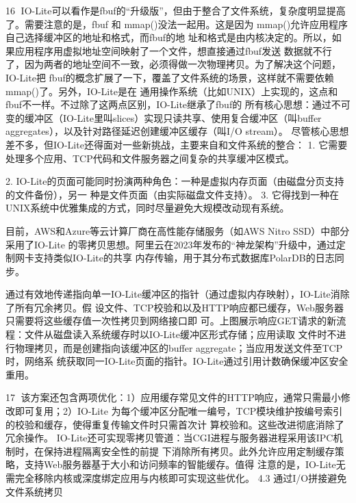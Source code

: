                                                                16
IO-Lite可以看作是fbuf的“升级版”，但由于整合了文件系统，复杂度明显提高了。需要注意的是，fbuf
和 mmap()﻿没法一起用。这是因为 ﻿mmap()﻿允许应用程序自己选择缓冲区的地址和格式，而fbuf的地
址和格式是由内核决定的。所以，如果应用程序用虚拟地址空间映射了一个文件，想直接通过fbuf发送
数据就不行了，因为两者的地址空间不一致，必须得做一次物理拷贝。为了解决这个问题，IO-Lite把
fbuf的概念扩展了一下，覆盖了文件系统的场景，这样就不需要依赖 ﻿mmap()﻿了。另外，IO-Lite是在
通用操作系统（比如UNIX）上实现的，这点和fbuf不一样。不过除了这两点区别，IO-Lite继承了fbuf的
所有核心思想：通过不可变的缓冲区（IO-Lite里叫slices）实现只读共享、使用复合缓冲区（叫buffer
aggregates），以及针对路径延迟创建缓冲区缓存（叫I/O stream）。
尽管核心思想差不多，但IO-Lite还得面对一些新挑战，主要来自和文件系统的整合：
  1. 它需要处理多个应用、TCP代码和文件服务器之间复杂的共享缓冲区模式。

  2. IO-Lite的页面可能同时扮演两种角色：一种是虚拟内存页面（由磁盘分页支持的文件备份），另一
     种是文件页面（由实际磁盘文件支持）。
  3. 它得找到一种在UNIX系统中优雅集成的方式，同时尽量避免大规模改动现有系统。

目前，AWS和Azure等云计算厂商在高性能存储服务（如AWS Nitro SSD）中部分采用了IO-Lite
的零拷贝思想。阿里云在2023年发布的“神龙架构”升级中，通过定制网卡支持类似IO-Lite的共享
内存传输，用于其分布式数据库PolarDB的日志同步。




通过有效地传递指向单一IO-Lite缓冲区的指针（通过虚拟内存映射），IO-Lite消除了所有冗余拷贝。假
设文件、TCP校验和以及HTTP响应都已缓存，Web服务器只需要将这些缓存值一次性拷贝到网络接口即
可。上图展示响应GET请求的新流程：文件从磁盘读入系统缓存时以IO-Lite缓冲区形式存储；应用读取
文件时不进行物理拷贝，而是创建指向该缓冲区的buffer aggregate；当应用发送文件至TCP时，网络系
统获取同一IO-Lite页面的指针。IO-Lite通过引用计数确保缓冲区安全重用。

                                                      17
该方案还包含两项优化：1）应用缓存常见文件的HTTP响应，通常只需最小修改即可复用；2）IO-Lite
为每个缓冲区分配唯一编号，TCP模块维护按编号索引的校验和缓存，使得重复传输文件时只需首次计
算校验和。这些改进彻底消除了冗余操作。
IO-Lite还可实现零拷贝管道：当CGI进程与服务器进程采用该IPC机制时，在保持进程隔离安全性的前提
下消除所有拷贝。此外允许应用定制缓存策略，支持Web服务器基于大小和访问频率的智能缓存。值得
注意的是，IO-Lite无需完全移除内核或深度绑定应用与内核即可实现这些优化。
4.3 通过I/O拼接避免文件系统拷贝




